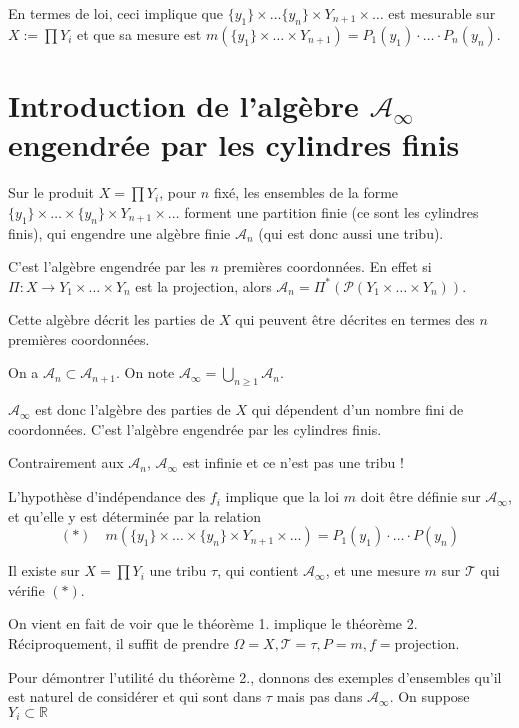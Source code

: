 \documentclass[10pt,a4paper,notitlepage ]{report}
\begin{document}
En termes de loi, ceci implique que $\{y_1\}\times \dots \{y_n\} \times Y_{n+1} \times \dots$ est mesurable sur $X:=\prod Y_i$ et que sa mesure est $m(\{y_1\}\times \dots \times Y_{n+1}) = P_1(y_1) \cdot \dots \cdot P_n(y_n)$.

\section{Introduction de l'algèbre $\mathcal A_\infty$ engendrée par les cylindres finis}

Sur le produit $X = \prod Y_i$, pour $n$ fixé, les ensembles de la forme $\{y_1\}\times \dots \times \{y_n\}\times Y_{n+1} \times \dots$ forment une partition finie (ce sont les cylindres finis), qui engendre une algèbre finie $\mathcal A_n$ (qui est donc aussi une tribu).

C'est l'algèbre engendrée par les $n$ premières coordonnées. En effet si $\Pi : X \rightarrow Y_1 \times \dots \times Y_n$ est la projection, alors $\mathcal A_n = \Pi^* (\mathcal P(Y_1 \times \dots \times Y_n))$.

Cette algèbre décrit les parties de $X$ qui peuvent être décrites en termes des $n$ premières coordonnées.

On a $\mathcal A_n \subset \mathcal A_{n+1}$. On note $\mathcal A_\infty = \underset{n\ge 1}{\bigcup} \mathcal A_n$.

$\mathcal A_\infty$ est donc l'algèbre des parties de $X$ qui dépendent d'un nombre fini de coordonnées. C'est l'algèbre engendrée par les cylindres finis.

Contrairement aux $\mathcal A_n$, $\mathcal A_\infty$ est infinie et ce n'est pas une tribu !

L'hypothèse d'indépendance des $f_i$ implique que la loi $m$ doit être définie sur $\mathcal A_\infty$, et qu'elle y est déterminée par la relation \[ (*) \quad m(\{y_1\}\times \dots \times \{y_n\} \times Y_{n+1} \times \dots ) = P_1(y_1) \cdot\dots\cdot P(y_n)\]

\begin{theorem}
	Il existe sur $X = \prod Y_i$ une tribu $\tau$, qui contient $\mathcal A_\infty$, et une mesure $m$ sur $\mathcal T$ qui vérifie $(*)$.
\end{theorem}

On vient en fait de voir que le théorème 1. implique le théorème 2.
Réciproquement, il suffit de prendre $\Omega = X, \mathcal T = \tau, P=m, f=\text{projection}$.

Pour démontrer l'utilité du théorème 2., donnons des exemples d'ensembles qu'il est naturel de considérer et qui sont dans $\tau$ mais pas dans $\mathcal A_\infty$. On suppose $Y_i \subset \mathbb R$
\end{document}
